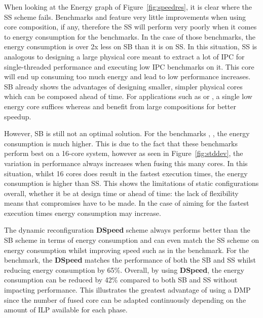 When looking at the Energy graph of Figure~\ref{fig:speedres}, it is clear where the SS scheme fails.
Benchmarks  and  feature very little improvements when using core composition, if any, therefore the SS will perform very poorly when it comes to energy consumption for the benchmarks.
In the case of those benchmarks, the energy consumption is over 2x less on SB than it is on SS.
In this situation, SS is analogous to designing a large physical core meant to extract a lot of IPC for single-threaded performance and executing low IPC benchmarks on it.
This core will end up consuming too much energy and lead to low performance increases.
SB already shows the advantages of designing smaller, simpler physical cores which can be composed ahead of time.
For applications such as  or , a single low energy core suffices whereas  and  benefit from large compositions for better speedup.

However, SB is still not an optimal solution. 
For the benchmarks , ,  the energy consumption is much higher.
This is due to the fact that these benchmarks perform best on a 16-core system, however as seen in Figure~\ref{fig:stddev}, the variation in performance always increases when fusing this many cores.
In this situation, whilst 16 cores does result in the fastest execution times, the energy consumption is higher than SS.
This shows the limitations of static configurations overall, whether it be at design time or ahead of time: the lack of flexibility means that compromises have to be made.
In the case of aiming for the fastest execution times energy consumption may increase.

The dynamic reconfiguration \textbf{DSpeed} scheme always performs better than the SB scheme in terms of energy consumption and can even match the SS scheme on energy consumption whilst improving speed such as in the  benchmark.
For the  benchmark, the \textbf{DSpeed} matches the performance of both the SB and SS whilst reducing energy consumption by 65\%.
Overall, by using \textbf{DSpeed}, the energy consumption can be reduced by 42\% compared to both SB and SS without impacting performance.
This illustrates the greatest advantage of using a DMP since the number of fused core can be adapted continuously depending on the amount of ILP available for each phase.


